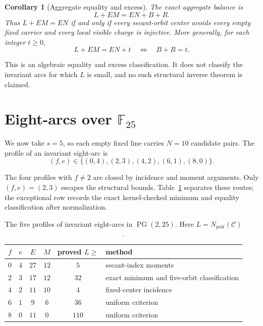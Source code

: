 \documentclass[11pt]{article}
\newtheorem{corollary}[theorem]{Corollary}
\theoremstyle{definition}
\theoremstyle{remark}
\newcommand{\PG}{\operatorname{PG}}
\newcommand{\F}{\mathbb{F}}
\newcommand{\cC}{\mathcal{C}}
\newcommand{\Npair}{N_{\mathrm{pair}}}
\begin{document}
\begin{corollary}[Aggregate equality and excess]
\label{cor:aggregate}
The exact aggregate balance is
\begin{equation}\label{eq:aggregate}
  L+EM=EN+B+R.
\end{equation}
Thus $L+EM=EN$ if and only if every secant-orbit center avoids every empty
fixed carrier and every local visible charge is injective.  More generally,
for each integer $t\ge0$,
\[
  L+EM=EN+t\quad\Longleftrightarrow\quad B+R=t.
\]
\end{corollary}

This is an algebraic equality and excess classification.  It does not
classify the invariant arcs for which $L$ is small, and no such structural
inverse theorem is claimed.

\section{Eight-arcs over \texorpdfstring{$\F_{25}$}{F25}}\label{sec:q25}

We now take $s=5$, so each empty fixed line carries $N=10$ candidate
pairs.  The profile of an invariant eight-arc is
\[
 (f,e)\in\{(0,4),(2,3),(4,2),(6,1),(8,0)\}.
\]

The four profiles with $f\ne2$ are closed by incidence and moment arguments.
Only $(f,e)=(2,3)$ escapes the structural bounds.  Table~\ref{tab:q25-profiles}
separates these routes; the exceptional row records the exact
kernel-checked minimum and equality classification after normalization.

\begin{table}[ht]
\centering
\small
\begin{tabular}{ccccc l}
\toprule
$f$ & $e$ & $E$ & $M$ & proved $L\ge$ & method \\
\midrule
$0$ & $4$ & $27$ & $12$ & $5$   & secant-index moments \\
$2$ & $3$ & $17$ & $12$ & $32$  & exact minimum and five-orbit classification \\
$4$ & $2$ & $11$ & $10$ & $4$   & fixed-center incidence \\
$6$ & $1$ & $9$  & $6$  & $36$  & uniform criterion \\
$8$ & $0$ & $11$ & $0$  & $110$ & uniform criterion \\
\bottomrule
\end{tabular}
\caption{The five profiles of invariant eight-arcs in $\PG(2,25)$.
Here $L=\Npair(\cC)$.}
\label{tab:q25-profiles}
\end{table}
\end{document}
